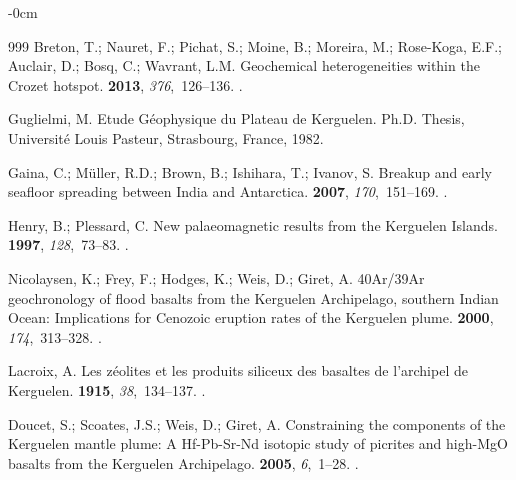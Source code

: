 \documentclass[geomatics,article,accept,pdftex,moreauthors]{Definitions/mdpi}
\begin{document}
\begin{adjustwidth}{-\extralength}{0cm}
\begin{thebibliography}{999}
Breton, T.; Nauret, F.; Pichat, S.; Moine, B.; Moreira, M.; Rose-Koga, E.F.;
  Auclair, D.; Bosq, C.; Wavrant, L.M.
\newblock Geochemical heterogeneities within the Crozet hotspot.
 {\bf 2013}, {\em
  376},~126--136.
.

Guglielmi, M.
\newblock Etude Géophysique du Plateau de Kerguelen.
\newblock Ph.D. Thesis, Université Louis Pasteur, Strasbourg, France,  1982.

Gaina, C.; Müller, R.D.; Brown, B.; Ishihara, T.; Ivanov, S.
\newblock Breakup and early seafloor spreading between India and Antarctica.
 {\bf 2007}, {\em
  170},~151--169.
.

Henry, B.; Plessard, C.
\newblock New palaeomagnetic results from the Kerguelen Islands.
 {\bf 1997}, {\em
  128},~73--83.
.

Nicolaysen, K.; Frey, F.; Hodges, K.; Weis, D.; Giret, A.
\newblock 40Ar/39Ar geochronology of flood basalts from the Kerguelen
  Archipelago, southern Indian Ocean: Implications for Cenozoic eruption rates
  of the Kerguelen plume.
 {\bf 2000}, {\em
  174},~313--328.
.

Lacroix, A.
\newblock Les zéolites et les produits siliceux des basaltes de l'archipel de
  Kerguelen.
 {\bf 1915}, {\em 38},~134--137.
.

Doucet, S.; Scoates, J.S.; Weis, D.; Giret, A.
\newblock Constraining the components of the Kerguelen mantle plume: A
  Hf-Pb-Sr-Nd isotopic study of picrites and high-MgO basalts from the
  Kerguelen Archipelago.
 {\bf 2005}, \emph{6},~1--28. %
.


\end{thebibliography}
\end{adjustwidth}
\end{document}
